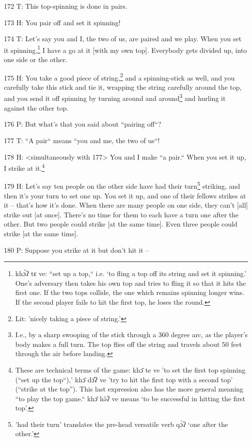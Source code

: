 172 T: This top-spinning is done in pairs.

173 H: You pair off and set it spinning!

174 T: Let's say you and I, the two of us, are paired and we play. When you set
it spinning,\footnote{khɔ̀ʔ tɛ ve: ``set up a top,`` i.e. `to fling a top off its string and set it spinning.' One's adversary then takes his own top and tries to fling it so that it hits the first one. If the two tops collide, the one which remains spinning longer wins. If the second player fails to hit the first top, he loses the round.} I have a go at it [with my own top]. Everybody gets divided up,
into one side or the other.

175 H: You take a good piece of string,\footnote{Lit: 'nicely taking a piece of string.'} and a spinning-stick as well, and you
carefully take this stick and tie it, wrapping the string carefully around the
top, and you send it off spinning by turning around and around\footnote{I.e., by a sharp swooping of the stick through a 360 degree arc, as the player's body makes a full turn. The top flies off the string and travels about 50 feet through the air before landing.} and hurling
it against the other top.

176 P: But what's that you said about ``pairing off``?

177 T: ``A pair`` means ``you and me, the two of us``!

178 H: <simultaneously with 177> You and I make ``a pair.``
When you set it up, I strike at it.\footnote{These are technical terms of the game: khɔ̄ te ve 'to set the first top spinning (``set up the top``),' khɔ̄ dɔ̂ʔ ve 'try to hit the first top with a second top' (``strike at the top''). This last expression also has the more general meaning ``to play the top game.`` khɔ̄ hə̂ʔ ve means `to be successful in hitting the first top'.}

179 H: Let's say ten people on the other side have had their turn\footnote{'had their turn' translates the pre-head versatile verb qɔ̀ʔ `one after the other.'} striking,
and then it's your turn to set one up. You set it up, and one of their fellows
strikes at it -- that's how it's done. When there are many people on one side,
they can't [all] strike out [at once]. There's no time for them to each have a
turn one after the other. But two people could strike [at the same time]. Even
three people could strike [at the same time].

180 P: Suppose you strike at it but don't hit it --

